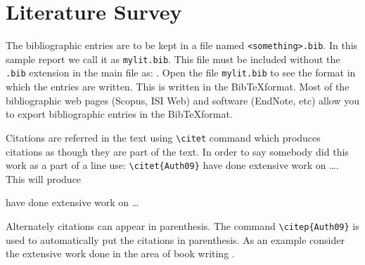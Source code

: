 
\chapter{Literature Survey}

The bibliographic entries are to be kept in a file named
\verb|<something>.bib|. In this sample report we call it as
\verb|mylit.bib|. This file must be included without the \verb|.bib|
extension in the main file as: \verb||.   Open the
file \verb|mylit.bib| to see the format in which the entries are
written. This is written in the Bib\TeX format. Most of the
bibliographic web pages (Scopus, ISI Web) and software (EndNote, etc)
allow you to export bibliographic entries in the Bib\TeX format.

Citations are referred in the text using \verb|\citet| command which produces
citations as though they are part of the text.  In order to say
somebody did this work as a part of a line use: \verb|\citet{Auth09}|
have done extensive work on \ldots.  This will produce

\citet{Auth09} have done extensive work on \ldots


Alternately citations can appear in parenthesis.  The
command \verb|\citep{Auth09}| is used to automatically put the
citations in parenthesis.
  As an example consider the extensive work
done in the area of book writing \citep{Mono08,Auth09}.

